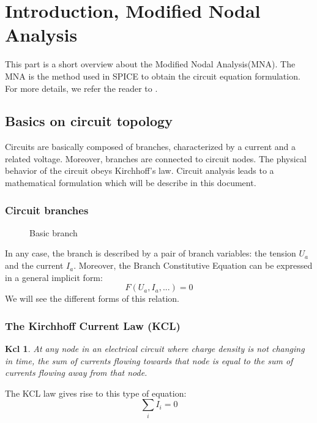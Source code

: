 
 
\section{Introduction, Modified Nodal Analysis}
This part is a short overview about the Modified Nodal Analysis(MNA). The MNA is the method used
in SPICE to obtain the circuit equation formulation. For more details, we refer the reader to \cite{Ogrodzki1994,chua1991}.

\subsection{Basics on circuit topology}

Circuits are basically composed of branches, characterized by a current and a related voltage.
Moreover, branches are connected to circuit nodes. The physical behavior of the circuit obeys
Kirchhoff's law. Circuit analysis leads to a mathematical formulation which will be describe in this
document.

\subsubsection{Circuit branches}
\begin{figure}[h]
\centerline{
 \scalebox{0.6}{
    
 }
}
\caption{Basic branch}
\label{fig-Basic-branch}
\end{figure}
In any case, the branch is described by a pair of branch variables: the tension $U_{a}$ and the current $I_{a}$.
Moreover, the Branch Constitutive Equation can be expressed in a general implicit form:
\begin{equation}\label{BCE}F(U_{a},I_{a},...)=0\end{equation}
We will see the different forms of this relation.
\subsubsection{The Kirchhoff Current Law (KCL)}
\newtheorem{kcl}{Kcl}
\begin{kcl}
At any node in an electrical circuit where charge density is not changing in time, the sum of
currents flowing towards that node is equal to the sum of currents flowing away from that node.
\end{kcl}
The KCL law gives rise to this type of equation:\\
\begin{equation}
 \sum_{i} I_{i}=0\label{eq:KCL}
\end{equation}

